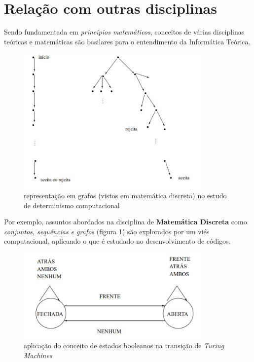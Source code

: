 \documentclass{article}
\begin{document}
\section{Relação com outras disciplinas}
Sendo fundamentada em \textit{princípios matemáticos}, conceitos de várias disciplinas teóricas e matemáticas são basilares para o entendimento da Informática Teórica. 

\begin{figure}[ht]
    \centering
    \includegraphics[width=0.85\textwidth]{grafos}
    \caption{ representação em grafos (vistos em matemática discreta) no estudo de determinismo computacional}
    \label{fig:exemplo1}
\end{figure}

Por exemplo, assuntos abordados na disciplina de \textbf{Matemática Discreta} como \textit{conjuntos, sequências e grafos} (figura \ref{fig:exemplo1}) são explorados por um viés computacional, aplicando o que é estudado no desenvolvimento de códigos.

\begin{figure}[ht]
    \centering
    \includegraphics[width=0.85\textwidth]{logica}
    \caption{ aplicação do conceito de estados booleanos na transição de \emph{Turing Machines}}
    \label{fig:exemplo2}
\end{figure}
\end{document}
